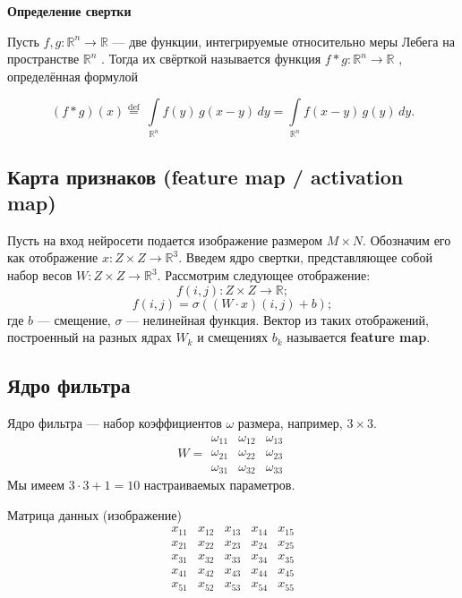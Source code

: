 \documentclass{article}
\begin{document}
	\textbf{Определение свертки}
	
	Пусть 
	$\displaystyle f,g:\mathbb {R} ^{n}\to \mathbb {R}$
	— две функции, интегрируемые относительно меры Лебега на пространстве 
	$\displaystyle \mathbb {R} ^{n}$
	. Тогда их свёрткой называется функция 
	$\displaystyle f*g:\mathbb {R} ^{n}\to \mathbb {R}$
	, определённая формулой
	
	$$\displaystyle (f*g)(x) \displaystyle {\stackrel {\mathrm {def} }{=}}\ \int \limits _{\mathbb {R} ^{n}}f(y)\,g(x-y)\,dy=\int \limits _{\mathbb {R} ^{n}}f(x-y)\,g(y)\,dy.$$
	
	\subsection{Карта признаков (feature map / activation map)}
	
	Пусть на вход нейросети подается изображение размером $M \times N$. Обозначим его как отображение $x: Z \times Z \to \mathbb{R}^3$. Введем ядро свертки, представляющее собой набор весов $W: Z \times Z \to \mathbb{R}^3$. Рассмотрим следующее отображение:
	$$f(i,j): Z \times Z \to \mathbb{R};$$
	$$f(i,j) = \sigma((W \cdot x)(i,j) + b);$$
	где $b$ --- смещение, $\sigma$ --- нелинейная функция. Вектор из таких отображений, построенный на разных ядрах $W_k$ и смещениях $b_k$ называется \textbf{feature map}.\\
	
	\subsection{Ядро фильтра}
	
	Ядро фильтра --- набор коэффициентов $\omega$ размера, например, $3 \times 3$.\\
	$$ W = \begin{matrix}
		\omega_{11} & \omega_{12} & \omega_{13}\\
		\omega_{21} & \omega_{22} & \omega_{23}\\
		\omega_{31} & \omega_{32} & \omega_{33}
	\end{matrix}$$
	Мы имеем $3 \cdot 3 + 1 = 10$ настраиваемых параметров.

	Матрица данных (изображение)
	$$
	\begin{matrix}
		x_{11} & x_{12} & x_{13} & x_{14} & x_{15}\\
		x_{21} & x_{22} & x_{23} & x_{24} & x_{25}\\
		x_{31} & x_{32} & x_{33} & x_{34} & x_{35}\\
		x_{41} & x_{42} & x_{43} & x_{44} & x_{45}\\
		x_{51} & x_{52} & x_{53} & x_{54} & x_{55}\\
	\end{matrix}
	$$
	
\end{document}
